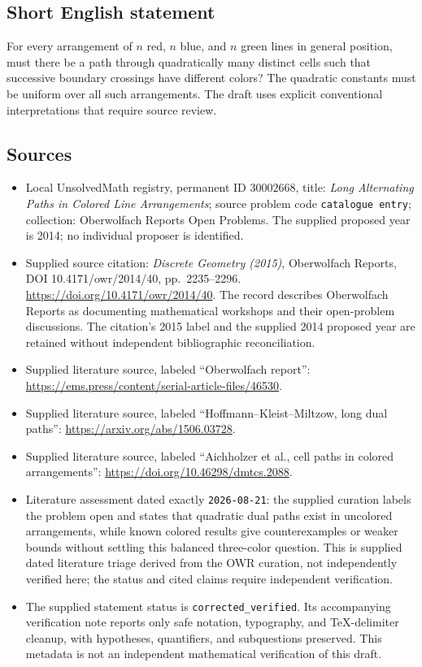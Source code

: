 \documentclass[11pt]{article}
\begin{document}
\subsection{Short English statement}
For every arrangement of \(n\) red, \(n\) blue, and \(n\) green lines in general position, must there be a path through quadratically many distinct cells such that successive boundary crossings have different colors? The quadratic constants must be uniform over all such arrangements. The draft uses explicit conventional interpretations that require source review.
\subsection{Sources}
\begin{itemize}
\item Local UnsolvedMath registry, permanent ID \(30002668\), title: \emph{Long Alternating Paths in Colored Line Arrangements}; source problem code \texttt{catalogue entry}; collection: Oberwolfach Reports Open Problems. The supplied proposed year is 2014; no individual proposer is identified.
\item Supplied source citation: \emph{Discrete Geometry (2015)}, Oberwolfach Reports, DOI 10.4171/owr/2014/40, pp.\ 2235--2296. \url{https://doi.org/10.4171/owr/2014/40}. The record describes Oberwolfach Reports as documenting mathematical workshops and their open-problem discussions. The citation's 2015 label and the supplied 2014 proposed year are retained without independent bibliographic reconciliation.
\item Supplied literature source, labeled ``Oberwolfach report'': \url{https://ems.press/content/serial-article-files/46530}.
\item Supplied literature source, labeled ``Hoffmann--Kleist--Miltzow, long dual paths'': \url{https://arxiv.org/abs/1506.03728}.
\item Supplied literature source, labeled ``Aichholzer et al., cell paths in colored arrangements'': \url{https://doi.org/10.46298/dmtcs.2088}.
\item Literature assessment dated exactly \texttt{2026-08-21}: the supplied curation labels the problem open and states that quadratic dual paths exist in uncolored arrangements, while known colored results give counterexamples or weaker bounds without settling this balanced three-color question. This is supplied dated literature triage derived from the OWR curation, not independently verified here; the status and cited claims require independent verification.
\item The supplied statement status is \texttt{corrected\_verified}. Its accompanying verification note reports only safe notation, typography, and TeX-delimiter cleanup, with hypotheses, quantifiers, and subquestions preserved. This metadata is not an independent mathematical verification of this draft.
\end{itemize}
\end{document}
